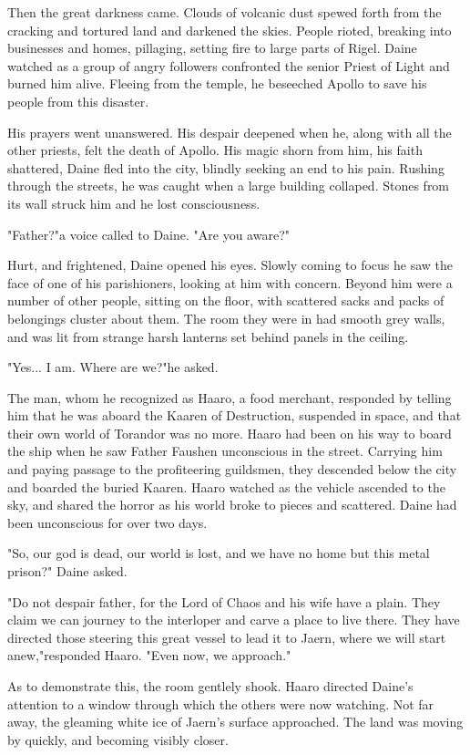 \begin{multicols*}{2}
Then the great darkness came. Clouds of volcanic dust spewed forth from the cracking and tortured land and darkened the skies. People rioted, breaking into businesses and homes, pillaging, setting fire to large parts of Rigel. Daine watched as a group of angry followers confronted the senior Priest of Light and burned him alive. Fleeing from the temple, he beseeched Apollo to save his people from this disaster.

His prayers went unanswered. His despair deepened when he, along with all the other priests, felt the death of
Apollo. His magic shorn from him, his faith shattered, Daine fled into the city, blindly seeking an end to his pain. Rushing through the streets, he was caught when a large building collaped. Stones from its wall struck him and he lost consciousness.

"Father?"a voice called to Daine. "Are you aware?"

Hurt, and frightened, Daine opened his eyes. Slowly coming to focus he saw the face of one of his parishioners, looking at him with concern. Beyond him were a number of other people, sitting on the floor, with scattered sacks and packs of belongings cluster about them. The room they were in had smooth grey walls, and was lit from strange harsh lanterns set behind panels in the ceiling.

"Yes... I am. Where are we?"he asked.

The man, whom he recognized as Haaro, a food merchant, responded by telling him that he was aboard the Kaaren of Destruction, suspended in space, and that their own world of Torandor was no more. Haaro had been on his way to board the ship when he saw Father Faushen unconscious in the street.  Carrying him and paying passage to the profiteering guildsmen, they descended below the city and boarded the buried Kaaren. Haaro watched as the vehicle ascended to the sky, and shared the horror as his world broke to pieces and scattered. Daine had been unconscious for over two days.

"So, our god is dead, our world is lost, and we have no home but this metal prison?" Daine asked.

"Do not despair father, for the Lord of Chaos and his wife have a plain. They claim we can journey to the interloper and carve a place to live there. They have directed those steering this great vessel to lead it to Jaern, where we will start anew,"responded Haaro. "Even now, we approach."

As to demonstrate this, the room gentlely shook. Haaro directed Daine's attention to a window through which the others were now watching. Not far away, the gleaming white ice of Jaern's surface approached. The land was moving by quickly, and becoming visibly closer.


\end{multicols*}

